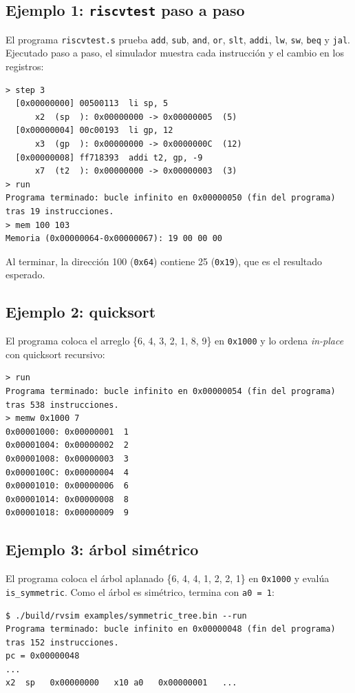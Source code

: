 \documentclass[11pt,a4paper]{article}
\begin{document}
\subsection{Ejemplo 1: \texttt{riscvtest} paso a paso}

El programa \texttt{riscvtest.s} prueba \texttt{add}, \texttt{sub}, \texttt{and},
\texttt{or}, \texttt{slt}, \texttt{addi}, \texttt{lw}, \texttt{sw}, \texttt{beq} y
\texttt{jal}. Ejecutado paso a paso, el simulador muestra cada instrucción y el cambio
en los registros:

\begin{Verbatim}
> step 3
  [0x00000000] 00500113  li sp, 5
      x2  (sp  ): 0x00000000 -> 0x00000005  (5)
  [0x00000004] 00c00193  li gp, 12
      x3  (gp  ): 0x00000000 -> 0x0000000C  (12)
  [0x00000008] ff718393  addi t2, gp, -9
      x7  (t2  ): 0x00000000 -> 0x00000003  (3)
> run
Programa terminado: bucle infinito en 0x00000050 (fin del programa)
tras 19 instrucciones.
> mem 100 103
Memoria (0x00000064-0x00000067): 19 00 00 00
\end{Verbatim}

Al terminar, la dirección 100 (\texttt{0x64}) contiene 25 (\texttt{0x19}), que es el
resultado esperado.

\subsection{Ejemplo 2: quicksort}

El programa coloca el arreglo \{6, 4, 3, 2, 1, 8, 9\} en \texttt{0x1000} y lo ordena
\textit{in-place} con quicksort recursivo:

\begin{Verbatim}
> run
Programa terminado: bucle infinito en 0x00000054 (fin del programa)
tras 538 instrucciones.
> memw 0x1000 7
0x00001000: 0x00000001  1
0x00001004: 0x00000002  2
0x00001008: 0x00000003  3
0x0000100C: 0x00000004  4
0x00001010: 0x00000006  6
0x00001014: 0x00000008  8
0x00001018: 0x00000009  9
\end{Verbatim}

\subsection{Ejemplo 3: árbol simétrico}

El programa coloca el árbol aplanado \{6, 4, 4, 1, 2, 2, 1\} en \texttt{0x1000} y
evalúa \texttt{is\_symmetric}. Como el árbol es simétrico, termina con
\texttt{a0 = 1}:

\begin{Verbatim}
$ ./build/rvsim examples/symmetric_tree.bin --run
Programa terminado: bucle infinito en 0x00000048 (fin del programa)
tras 152 instrucciones.
pc = 0x00000048
...
x2  sp   0x00000000   x10 a0   0x00000001   ...
\end{Verbatim}
\end{document}
